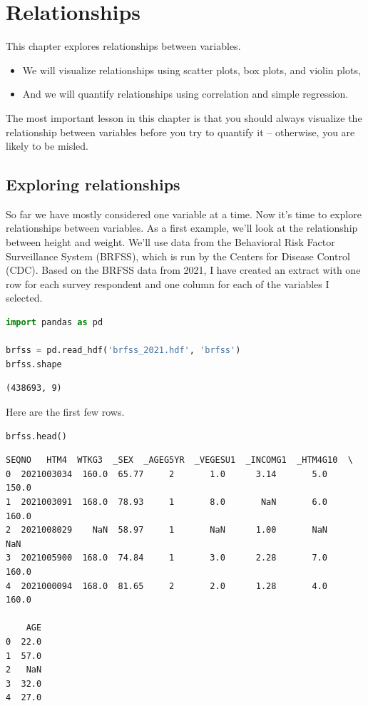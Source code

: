 \hypertarget{relationships}{%
\chapter{Relationships}\label{relationships}}

This chapter explores relationships between variables.

\begin{itemize}
\item
  We will visualize relationships using scatter plots, box plots, and
  violin plots,
\item
  And we will quantify relationships using correlation and simple
  regression.
\end{itemize}

The most important lesson in this chapter is that you should always
visualize the relationship between variables before you try to quantify
it -- otherwise, you are likely to be misled.

\hypertarget{exploring-relationships}{%
\section{Exploring relationships}\label{exploring-relationships}}

So far we have mostly considered one variable at a time. Now it's time
to explore relationships between variables. As a first example, we'll
look at the relationship between height and weight. We'll use data from
the Behavioral Risk Factor Surveillance System (BRFSS), which is run by
the Centers for Disease Control (CDC). Based on the BRFSS data from
2021, I have created an extract with one row for each survey respondent
and one column for each of the variables I selected.

\begin{lstlisting}[language=Python,style=source]
import pandas as pd

brfss = pd.read_hdf('brfss_2021.hdf', 'brfss')
brfss.shape
\end{lstlisting}

\begin{lstlisting}[style=output]
(438693, 9)
\end{lstlisting}

Here are the first few rows.

\begin{lstlisting}[language=Python,style=source]
brfss.head()
\end{lstlisting}

\begin{lstlisting}[style=output]
        SEQNO   HTM4  WTKG3  _SEX  _AGEG5YR  _VEGESU1  _INCOMG1  _HTM4G10  \
0  2021003034  160.0  65.77     2       1.0      3.14       5.0     150.0   
1  2021003091  168.0  78.93     1       8.0       NaN       6.0     160.0   
2  2021008029    NaN  58.97     1       NaN      1.00       NaN       NaN   
3  2021005900  168.0  74.84     1       3.0      2.28       7.0     160.0   
4  2021000094  168.0  81.65     2       2.0      1.28       4.0     160.0   

    AGE  
0  22.0  
1  57.0  
2   NaN  
3  32.0  
4  27.0  
\end{lstlisting}

